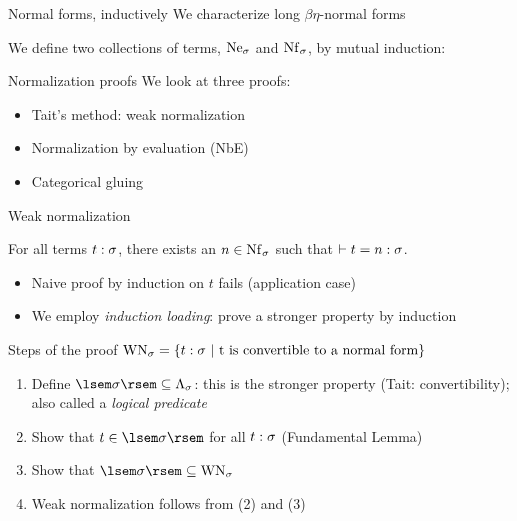 \documentclass{beamer}
\begin{document}
\begin{frame}{Normal forms, inductively}
We characterize long $\beta\eta$-normal forms
\begin{defn}
We define two collections of terms, $\Ne[\sigma]$ and $\Nf[\sigma]$, by mutual induction:
\vspace{-12pt}
\begin{figure}
\end{figure}
\end{defn}
\end{frame}

\begin{frame}{Normalization proofs}
We look at three proofs:
\begin{itemize}
    \item Tait's method: weak normalization
    \item Normalization by evaluation (NbE)
    \item Categorical gluing
\end{itemize}
\end{frame}

\begin{frame}{Weak normalization}
\begin{thm}
For all terms $t : \sigma$, there exists an $n \in \Nf[\sigma]$ such that $\vdash t = n : \sigma$.
\end{thm}
\begin{itemize}
    \item Naive proof by induction on $t$ fails (application case)
    \item We employ \textit{induction loading}: prove a stronger property by induction
\end{itemize}
\end{frame}

\begin{frame}{Steps of the proof}
$\mathrm{WN}_\sigma = \left\{ t : \sigma \ |\  \text{t is convertible to a normal form} \right\}$
\begin{enumerate}
    \item Define $\sem{\sigma} \subs \Tm[\sigma]$: this is the stronger property (Tait: convertibility); also called a \emph{logical predicate}
    \item Show that $t \in \sem{\sigma}$ for all $t : \sigma$ (Fundamental Lemma)
    \item Show that $\sem{\sigma} \subs \mathrm{WN}_\sigma$
    \item Weak normalization follows from (2) and (3)
\end{enumerate}
\end{frame}
\end{document}

